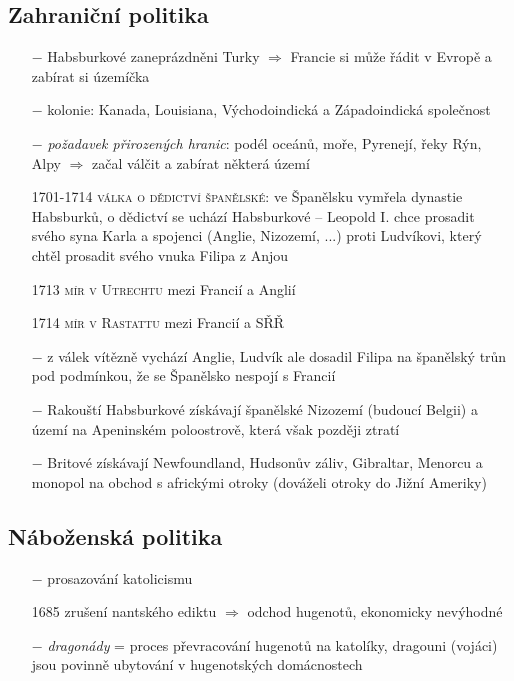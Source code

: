 \documentclass{article}
\begin{document}
\subsection*{Zahraniční politika}
\begin{itemize}
    \vspace{-0.5em}
    \setlength\itemsep{0.15em}
    \item[$-$] Habsburkové zaneprázdněni Turky $\Rightarrow$ Francie si může řádit v Evropě a zabírat si územíčka
    \item[$-$] kolonie: Kanada, Louisiana, Východoindická a Západoindická společnost
    \item[$-$] \textit{požadavek přirozených hranic}: podél oceánů, moře, Pyrenejí, řeky Rýn, Alpy $\Rightarrow$ začal válčit a zabírat některá území
    \item[1701-1714] \textsc{válka o dědictví španělské}: ve Španělsku vymřela dynastie Habsburků, o dědictví se uchází Habsburkové -- Leopold I. chce prosadit svého syna Karla a spojenci (Anglie, Nizozemí, ...) proti Ludvíkovi, který chtěl prosadit svého vnuka Filipa z Anjou
    \item[1713] \textsc{mír v Utrechtu} mezi Francií a Anglií
    \item[1714] \textsc{mír v Rastattu} mezi Francií a SŘŘ
    \item[$-$] z válek vítězně vychází Anglie, Ludvík ale dosadil Filipa na španělský trůn pod podmínkou, že se Španělsko nespojí s Francií
    \item[$-$] Rakouští Habsburkové získávají španělské Nizozemí (budoucí Belgii) a území na Apeninském poloostrově, která však později ztratí
    \item[$-$] Britové získávají Newfoundland, Hudsonův záliv, Gibraltar, Menorcu a monopol na obchod s africkými otroky (dováželi otroky do Jižní Ameriky)
\end{itemize}


\subsection*{Náboženská politika}
\begin{itemize}
    \vspace{-0.5em}
    \setlength\itemsep{0.15em}
    \item[$-$] prosazování katolicismu
    \item[1685] zrušení nantského ediktu $\Rightarrow$ odchod hugenotů, ekonomicky nevýhodné
    \item[$-$] \textit{dragonády} = proces převracování hugenotů na katolíky, dragouni (vojáci) jsou povinně ubytování v hugenotských domácnostech
\end{itemize}
\end{document}
